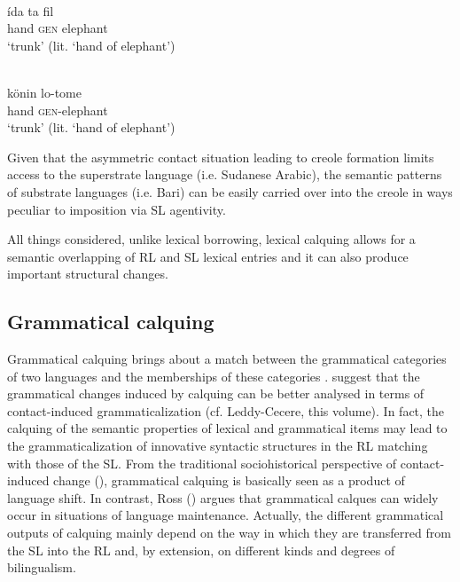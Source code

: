 \documentclass[output=paper]{langsci/langscibook}
\begin{document}
\ea\label{ex:key:eleph}
 \\
\gll   ída ta fil\\
       hand \textsc{gen} elephant \\
\glt   `trunk’ (lit. ‘hand of elephant’)

\\
\gll   könin lo-tome\\
       hand \textsc{gen}-elephant \\
\glt   `trunk’ (lit. ‘hand of elephant’)
\z
\z

Given that the asymmetric contact situation leading to creole formation limits access to the superstrate language (i.e. Sudanese Arabic), the semantic patterns of substrate languages (i.e. Bari) can be easily carried over into the creole in ways peculiar to imposition via SL agentivity. 

All things considered, unlike lexical borrowing, lexical calquing allows for a semantic overlapping of RL and SL lexical entries and it can also produce important structural changes. 


 
 \subsection{Grammatical calquing}\label{sec:gra}

Grammatical calquing brings about a match between the grammatical categories of two languages and the memberships of these categories \citep[132]{Ross2007}. \citet{HeineKuteva2005} suggest that the grammatical changes induced by calquing can be better analysed in terms of contact-induced grammaticalization (cf. Leddy-Cecere, this volume). In fact, the calquing of the semantic properties of lexical and grammatical items may lead to the grammaticalization of innovative syntactic structures in the RL matching with those of the SL. From the traditional sociohistorical perspective of contact-induced change (\citealt{ThomasonKaufman1988}), grammatical calquing is basically seen as a product of language shift. In contrast, Ross (\citeyear[131]{Ross2007}) argues that grammatical calques can widely occur in situations of language maintenance. Actually, the different grammatical outputs of calquing mainly depend on the way in which they are transferred from the SL into the RL and, by extension, on different kinds and degrees of bilingualism.   
\end{document}
